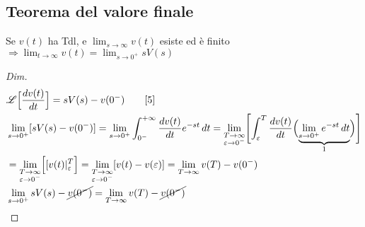 \subsection{Teorema del valore finale}
Se $v(t)$ ha Tdl, e $\lim_{s\to \infty}v(t)$ esiste ed è finito $\Rightarrow \lim_{t\to \infty}v(t) = \lim_{s\to 0^+}sV(s)$
\begin{proof}[Dim]
   \[
      \begin{split}
         & \mathscr{L}\Bigl[\frac{dv(t)}{dt}\Bigr] = sV(s) - v(0^-)\qquad [5]\\
         & \lim_{s\to 0^+}[sV(s) - v(0^-)] = \lim_{s\to 0^+}\int_{0^-}^{+\infty}\frac{dv(t)}{dt}e^{-st}\,dt = \lim_{\substack{T\to \infty \\ \varepsilon\to 0^-}}\Biggl[\int_\varepsilon^T\frac{dv(t)}{dt}\Bigl(\underbrace{\lim_{s\to 0^+}e^{-st}\,dt}_1\Bigr)\Biggr]\\
         & = \lim_{\substack{T\to \infty \\ \varepsilon\to 0^-}} \Bigl[[v(t)|_\varepsilon^T\Bigr] = \lim_{\substack{T\to \infty \\ \varepsilon\to 0^-}}[v(t) - v(\varepsilon)] = \lim_{T\to\infty}v(T) - v(0^-)\\
         & \lim_{s\to 0^+}sV(s) - \cancel{v(0^-)} = \lim_{T\to\infty}v(T) - \cancel{v(0^-)}
      \end{split}
   \]
\end{proof}
